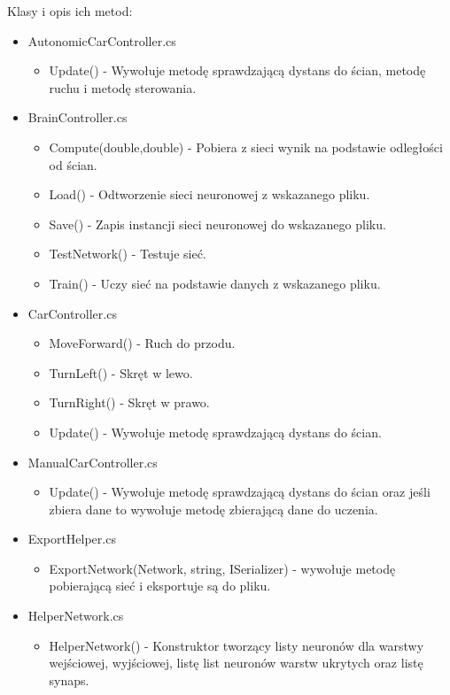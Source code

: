 \documentclass[12pt,a4paper]{article}
\begin{document}
	Klasy i opis ich metod:
	\begin{itemize}
		\item AutonomicCarController.cs
			\begin{itemize}
				\item Update() - Wywołuje metodę sprawdzającą dystans do ścian, metodę ruchu i metodę sterowania.
			\end{itemize}
		\item BrainController.cs
			\begin{itemize}
				\item Compute(double,double) - Pobiera z sieci wynik na podstawie odległości od ścian.
				\item Load() - Odtworzenie sieci neuronowej z wskazanego pliku.
				\item Save() - Zapis instancji sieci neuronowej do wskazanego pliku.
				\item TestNetwork() - Testuje sieć.
				\item Train() - Uczy sieć na podstawie danych z wskazanego pliku.
			\end{itemize}
		\item CarController.cs
			\begin{itemize}
				\item MoveForward() - Ruch do przodu.
				\item TurnLeft() - Skręt w lewo.
				\item TurnRight() - Skręt w prawo.
				\item Update() - Wywołuje metodę sprawdzającą dystans do ścian.
			\end{itemize}
		\item ManualCarController.cs
			\begin{itemize}
				\item Update() - Wywołuje metodę sprawdzającą dystans do ścian oraz jeśli zbiera dane to wywołuje metodę zbierającą dane do uczenia.
			\end{itemize}
		\item ExportHelper.cs
			\begin{itemize}
				\item ExportNetwork(Network, string, ISerializer) - wywołuje metodę pobierającą sieć i eksportuje są do pliku.
			\end{itemize}
		\item HelperNetwork.cs
			\begin{itemize}
				\item HelperNetwork() - Konstruktor tworzący listy neuronów dla warstwy wejściowej, wyjściowej, listę list neuronów warstw ukrytych oraz listę synaps.

\end{itemize}
\end{itemize}
\end{document}
